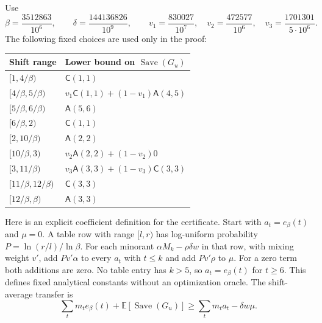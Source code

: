 Use
\[
 \beta=\frac{3512863}{10^6},\qquad
 \delta=\frac{144136826}{10^9},\qquad
 v_1=\frac{830027}{10^7},\quad
 v_2=\frac{472577}{10^6},\quad
 v_3=\frac{1701301}{5\cdot10^6}.
\]
The following fixed choices are used only in the proof:
\begin{center}
\small
\begin{tabular}{ll}
\hline
Shift range & Lower bound on $\operatorname{Save}(G_u)$\\
\hline
$[1,4/\beta)$ & $\mathsf C(1,1)$\\
$[4/\beta,5/\beta)$ & $v_1\mathsf C(1,1)+(1-v_1)\mathsf A(4,5)$\\
$[5/\beta,6/\beta)$ & $\mathsf A(5,6)$\\
$[6/\beta,2)$ & $\mathsf C(1,1)$\\
$[2,10/\beta)$ & $\mathsf A(2,2)$\\
$[10/\beta,3)$ & $v_2\mathsf A(2,2)+(1-v_2)0$\\
$[3,11/\beta)$ & $v_3\mathsf A(3,3)+(1-v_3)\mathsf C(3,3)$\\
$[11/\beta,12/\beta)$ & $\mathsf C(3,3)$\\
$[12/\beta,\beta)$ & $\mathsf A(3,3)$\\
\hline
\end{tabular}
\end{center}

Here is an explicit coefficient definition for the certificate. Start
with $a_t=e_\beta(t)$ and $\mu=0$. A table row with range $[l,r)$
has log-uniform probability $P=\ln(r/l)/\ln\beta$. For each
minorant $\alpha M_k-\rho\delta w$ in that row, with mixing weight
$v'$, add $Pv'\alpha$ to every $a_t$ with $t\le k$ and add
$Pv'\rho$ to $\mu$. For a zero term both additions are zero.
No table entry has $k>5$, so $a_t=e_\beta(t)$ for $t\ge6$.
This defines fixed analytical constants without an optimization oracle.
The shift-average transfer is
\[
 \sum_t m_t e_\beta(t)+\mathbb E[\operatorname{Save}(G_u)]
 \ge\sum_t m_t a_t-\delta w\mu.
\]

